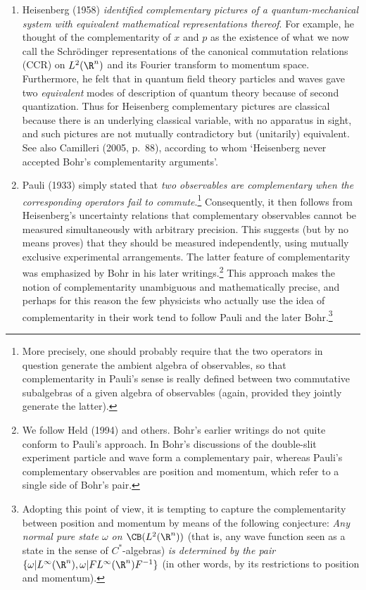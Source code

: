 \documentclass[12pt]{article}
\newcommand{\ca}{$C^*$-algebra} \newcommand{\jba}{JB-algebra}
\newcommand{\inv}{^{-1}} \newcommand{\sa}{_{\R}}
\newcommand{\om}{\omega} \newcommand{\Om}{\Omega}
\begin{document}
\begin{enumerate}
\item Heisenberg (1958) {\it  identified complementary pictures  of
a quantum-mechanical system with equivalent mathematical representations thereof}. For example, he thought of the complementarity of $x$ and $p$ as the
existence of what we now call the Schr\"{o}dinger representations of the canonical commutation relations (CCR) 
on $L^2(\R^n)$ and its Fourier transform to momentum space. 
Furthermore, he felt that in quantum field theory particles and waves gave two {\it equivalent} modes of description of quantum theory because of second quantization. 
Thus for Heisenberg complementary pictures are classical because there is an underlying classical variable, with no apparatus in sight, and such pictures are not mutually contradictory   but (unitarily) equivalent. See also Camilleri (2005, p.\ 88), according to whom `Heisenberg never accepted Bohr's complementarity arguments'. 
\item \label{item2list} Pauli (1933) simply stated that {\it two observables are complementary when the corresponding operators fail to commute}.\footnote{ More precisely, one should probably require that the two operators in question generate the ambient algebra of observables, so that complementarity in Pauli's sense is really defined between two commutative subalgebras
of a given algebra of observables (again, provided they jointly generate the latter).}
Consequently, it then follows from Heisenberg's uncertainty relations that complementary observables cannot be measured simultaneously with arbitrary precision. This suggests (but by no means proves) that they should be measured independently, using mutually exclusive experimental arrangements. The latter feature of complementarity was emphasized by Bohr in his later writings.\footnote{We follow Held (1994) and others. Bohr's  earlier writings do not quite conform to Pauli's approach. In  Bohr's discussions of the double-slit experiment particle and wave form a complementary pair, whereas Pauli's complementary observables are position and momentum, which refer to a single side of Bohr's  pair.} This approach makes the notion 
of  complementarity  unambiguous and mathematically precise, and perhaps for this reason
the few physicists who actually use the idea of complementarity in their work tend to follow Pauli and the later Bohr.\footnote{Adopting this point of view, it is tempting to capture the complementarity between position and momentum by means of the following conjecture: \textit{Any normal pure state $\om$ on $\CB(L^2(\R^n))$} (that is, any wave function seen as a state in the sense of \ca s) {\it is determined by the pair $\{\om| L^{\infty}(\R^n), \om| FL^{\infty}(\R^n)F\inv\}$} (in other words, by its restrictions to position and momentum).
}
\end{enumerate}
\end{document}
